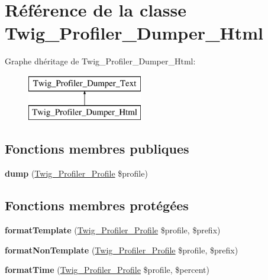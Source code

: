 \hypertarget{class_twig___profiler___dumper___html}{}\section{Référence de la classe Twig\+\_\+\+Profiler\+\_\+\+Dumper\+\_\+\+Html}
\label{class_twig___profiler___dumper___html}
Graphe d\textquotesingle{}héritage de Twig\+\_\+\+Profiler\+\_\+\+Dumper\+\_\+\+Html\+:\begin{figure}[H]
\begin{center}
\leavevmode
\includegraphics[height=2.000000cm]{class_twig___profiler___dumper___html}
\end{center}
\end{figure}
\subsection*{Fonctions membres publiques}
\begin{DoxyCompactItemize}
\item 
{\bfseries dump} (\hyperlink{class_twig___profiler___profile}{Twig\+\_\+\+Profiler\+\_\+\+Profile} \$profile)\hypertarget{class_twig___profiler___dumper___html_a6c5847be5fe44203b20ccca8ce59c05b}{}\label{class_twig___profiler___dumper___html_a6c5847be5fe44203b20ccca8ce59c05b}

\end{DoxyCompactItemize}
\subsection*{Fonctions membres protégées}
\begin{DoxyCompactItemize}
\item 
{\bfseries format\+Template} (\hyperlink{class_twig___profiler___profile}{Twig\+\_\+\+Profiler\+\_\+\+Profile} \$profile, \$prefix)\hypertarget{class_twig___profiler___dumper___html_a02c170148566e209ced5cdf1b743418b}{}\label{class_twig___profiler___dumper___html_a02c170148566e209ced5cdf1b743418b}

\item 
{\bfseries format\+Non\+Template} (\hyperlink{class_twig___profiler___profile}{Twig\+\_\+\+Profiler\+\_\+\+Profile} \$profile, \$prefix)\hypertarget{class_twig___profiler___dumper___html_aa1161e3f32546d26391304d787264ddd}{}\label{class_twig___profiler___dumper___html_aa1161e3f32546d26391304d787264ddd}

\item 
{\bfseries format\+Time} (\hyperlink{class_twig___profiler___profile}{Twig\+\_\+\+Profiler\+\_\+\+Profile} \$profile, \$percent)\hypertarget{class_twig___profiler___dumper___html_ae1ea1c70a40a31c730fd4cc049f31425}{}\label{class_twig___profiler___dumper___html_ae1ea1c70a40a31c730fd4cc049f31425}

\end{DoxyCompactItemize}


